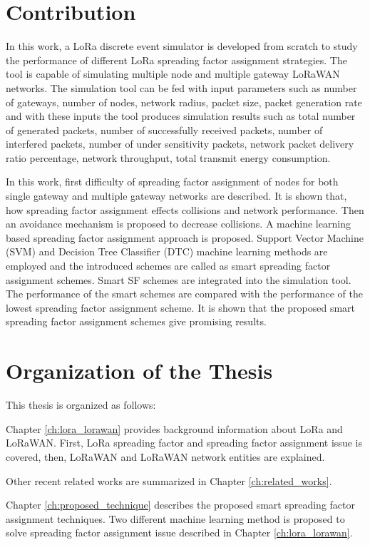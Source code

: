 \section{Contribution}
In this work, a LoRa discrete event simulator is developed from scratch to study the performance of different LoRa spreading factor assignment strategies. The tool is capable of simulating multiple node and multiple gateway LoRaWAN networks. The simulation tool can be fed with input parameters such as number of gateways, number of nodes, network radius, packet size, packet generation rate and with these inputs the tool produces simulation results such as total number of generated packets, number of successfully received packets, number of interfered packets, number of under sensitivity packets, network packet delivery ratio percentage, network throughput, total transmit energy consumption. 

In this work, first difficulty of spreading factor assignment of nodes for both single gateway and multiple gateway networks are described. It is shown that, how spreading factor assignment effects collisions and network performance. Then an avoidance mechanism is proposed to decrease collisions. A machine learning based spreading factor assignment approach is proposed. Support Vector Machine (SVM) and Decision Tree Classifier (DTC) machine learning methods are employed and the introduced schemes are called as smart spreading factor assignment schemes. Smart SF schemes are integrated into the simulation tool. The performance of the smart schemes are compared with the performance of the lowest spreading factor assignment scheme. It is shown that the proposed smart spreading factor assignment schemes give promising results.

\section{Organization of the Thesis}
This thesis is organized as follows:

Chapter \ref{ch:lora_lorawan} provides background information about LoRa and LoRaWAN. First, LoRa spreading factor and spreading factor assignment issue is covered, then, LoRaWAN and LoRaWAN network entities are explained.

Other recent related works are summarized in Chapter \ref{ch:related_works}.

Chapter \ref{ch:proposed_technique} describes the proposed smart spreading factor assignment techniques. Two different machine learning method is proposed to solve spreading factor assignment issue described in Chapter \ref{ch:lora_lorawan}.

